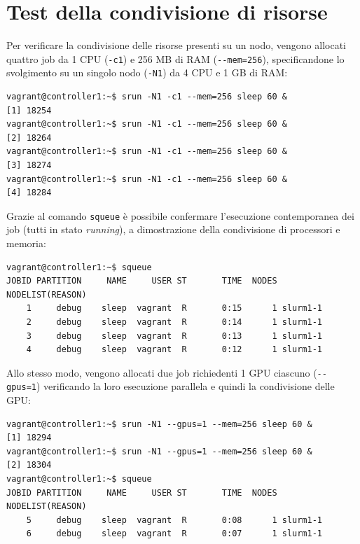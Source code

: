 \documentclass[12pt,a4paper,twoside,openright]{book}
\begin{document}
\section{Test della condivisione di risorse}
Per verificare la condivisione delle risorse presenti su un nodo, vengono allocati quattro job da 1 \ac{CPU} (\texttt{-c1}) e 256 \ac{MB} di \ac{RAM} (\texttt{{-}{-}mem=256}), specificandone lo svolgimento su un singolo nodo (\texttt{-N1}) da 4 \ac{CPU} e 1 \ac{GB} di \ac{RAM}:
\begin{verbatim}
vagrant@controller1:~$ srun -N1 -c1 --mem=256 sleep 60 &
[1] 18254
vagrant@controller1:~$ srun -N1 -c1 --mem=256 sleep 60 &
[2] 18264
vagrant@controller1:~$ srun -N1 -c1 --mem=256 sleep 60 &
[3] 18274
vagrant@controller1:~$ srun -N1 -c1 --mem=256 sleep 60 &
[4] 18284
\end{verbatim}
Grazie al comando \texttt{squeue} è possibile confermare l'esecuzione contemporanea dei job (tutti in stato \textit{running}), a dimostrazione della condivisione di processori e memoria:
\begin{verbatim}
vagrant@controller1:~$ squeue
JOBID PARTITION     NAME     USER ST       TIME  NODES NODELIST(REASON)
    1     debug    sleep  vagrant  R       0:15      1 slurm1-1
    2     debug    sleep  vagrant  R       0:14      1 slurm1-1
    3     debug    sleep  vagrant  R       0:13      1 slurm1-1
    4     debug    sleep  vagrant  R       0:12      1 slurm1-1
\end{verbatim}
Allo stesso modo, vengono allocati due job richiedenti 1 \ac{GPU} ciascuno (\texttt{{-}{-}gpus=1}) verificando la loro esecuzione parallela e quindi la condivisione delle \ac{GPU}:
\begin{verbatim}
vagrant@controller1:~$ srun -N1 --gpus=1 --mem=256 sleep 60 &
[1] 18294
vagrant@controller1:~$ srun -N1 --gpus=1 --mem=256 sleep 60 &
[2] 18304
vagrant@controller1:~$ squeue
JOBID PARTITION     NAME     USER ST       TIME  NODES NODELIST(REASON)
    5     debug    sleep  vagrant  R       0:08      1 slurm1-1
    6     debug    sleep  vagrant  R       0:07      1 slurm1-1
\end{verbatim}
\end{document}
